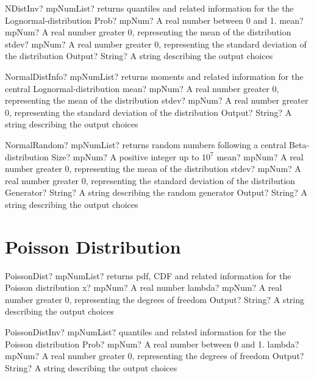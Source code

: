 \documentclass[12pt,a4paper,openany]{book}
\begin{document}
\begin{mpFunctionsExtract}
\mpFunctionFour
{NDistInv? mpNumList? returns quantiles and related information for the the Lognormal-distribution}
{Prob? mpNum? A real number between 0 and 1.}
{mean? mpNum? A real number greater 0, representing the mean of the distribution}
{stdev? mpNum? A real number greater 0, representing the standard deviation of the distribution}
{Output? String? A string describing the output choices}
\end{mpFunctionsExtract}

\begin{mpFunctionsExtract}
\mpFunctionThree
{NormalDistInfo? mpNumList? returns moments and related information for the central Lognormal-distribution}
{mean? mpNum? A real number greater 0, representing the mean of the distribution}
{stdev? mpNum? A real number greater 0, representing the standard deviation of the distribution}
{Output? String? A string describing the output choices}
\end{mpFunctionsExtract}

\begin{mpFunctionsExtract}
\mpFunctionFive
{NormalRandom? mpNumList? returns random numbers following a central Beta-distribution}
{Size? mpNum? A positive integer up to $10^7$}
{mean? mpNum? A real number greater 0, representing the mean of the distribution}
{stdev? mpNum? A real number greater 0, representing the standard deviation of the distribution}
{Generator? String? A string describing the random generator}
{Output? String? A string describing the output choices}
\end{mpFunctionsExtract}

\section{Poisson Distribution}

\begin{mpFunctionsExtract}
\mpFunctionThree
{PoissonDist? mpNumList? returns pdf, CDF and related information for the Poisson distribution}
{x? mpNum? A real number}
{lambda? mpNum? A real number greater 0, representing the degrees of freedom}
{Output? String? A string describing the output choices}
\end{mpFunctionsExtract}

\begin{mpFunctionsExtract}
\mpFunctionThree
{PoissonDistInv? mpNumList? quantiles and related information for the the Poisson distribution}
{Prob? mpNum? A real number between 0 and 1.}
{lambda? mpNum? A real number greater 0, representing the degrees of freedom}
{Output? String? A string describing the output choices}
\end{mpFunctionsExtract}
\end{document}
